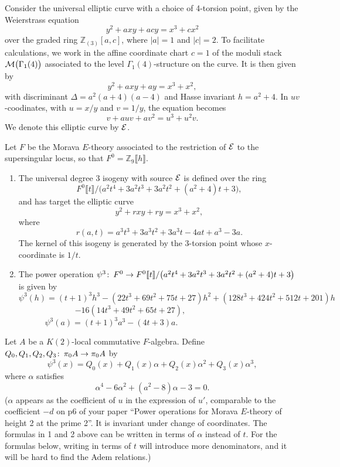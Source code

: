 \documentclass[12pt]{article}
\theoremstyle{definition}
\theoremstyle{remark}
\def\co{\colon\thinspace}
\newcommand{\mb}[1]{\mathbb{#1}}
\begin{document}
Consider the universal elliptic curve with a choice of 4-torsion point, given 
by the Weierstrass equation 
\[
 y^2 + a x y + a c y = x^3 + c x^2 
\]
over the graded ring ${\mb Z}_{(3)}[a,c]$, where $|a| = 1$ and $|c| = 2$.  To 
facilitate calculations, we work in the affine coordinate chart $c = 1$ of the 
moduli stack ${\cal M}\big(\Gamma_1(4)\big)$ associated to the level 
$\Gamma_1(4)$-structure on the curve. It is then given by 
\[
 y^2 + a x y + a y = x^3 + x^2, 
\]
with discriminant $\Delta = a^2(a + 4)(a - 4)$ and Hasse invariant 
$h = a^2 + 4$.  In $uv$-coodinates, with $u = x/y$ and $v = 1/y$, the 
equation becomes 
\[
 v + a u v + a v^2 = u^3 + u^2 v.  
\]
We denote this elliptic curve by $\cal E$.  

Let $F$ be the Morava $E$-theory associated to the restriction of $\cal E$ to 
the supersingular locus, so that $F^0 = {\mb Z}_9 \llbracket h \rrbracket$.  

\begin{enumerate}
 \item The universal degree 3 isogeny with source $\cal E$ is defined over 
 the ring 
 \[
  F^0 \llbracket t \rrbracket / 
  \big(a^2 t^4 + 3 a^2 t^3 + 3 a^2 t^2 + (a^2 + 4) t + 3\big), 
 \]
 and has target the elliptic curve 
 \[
  y^2 + r x y + r y = x^3 + x^2, 
 \]
 where 
 \[
  r(a,t) = a^3 t^3 + 3 a^3 t^2 + 3 a^3 t - 4 a t + a^3 - 3 a.  
 \]
 The kernel of this isogeny is generated by the 3-torsion point whose 
 $x$-coordinate is $1/t$.  
 \item The power operation $\psi^3\co F^0  \to F^0 \llbracket t \rrbracket / 
 \big(a^2 t^4 + 3 a^2 t^3 + 3 a^2 t^2 + (a^2 + 4) t + 3\big)$ is given by 
 \[
  \psi^3(h) = (t + 1)^3 h^3 - (22 t^3 + 69 t^2 + 75 t + 27) h^2 + (128 t^3 + 
  424 t^2 + 512 t + 201) h 
 \]
 \[
  - 16 (14 t^3 + 49 t^2 + 65 t + 27), 
  ~~~~~~~~~~~~~~~~~~~~~~~~~~~~~~~~ 
 \]
 \[
  \psi^3(a) = (t + 1)^3 a^3 - (4 t + 3) a.  
  ~~~~~~~~~~~~~~~~~~~~~~~~~~~~~~~~~~~~~~~~~~~~~~~~~~~~~ 
 \]
\end{enumerate}

Let $A$ be a $K(2)$-local commutative $F$-algebra.  Define 
$Q_0, Q_1, Q_2, Q_3\co\pi_0A \to \pi_0A$ by 
\[
 \psi^3 (x) = Q_0(x) + Q_1(x) \alpha + Q_2(x) \alpha^2 +Q_3(x) \alpha^3, 
\]
where $\alpha$ satisfies 
\[
 \alpha^4 - 6\alpha^2 + (a^2-8)\alpha-3 = 0.  
\]
($\alpha$ appears as the coefficient of $u$ in the expression of $u'$, 
comparable to the coefficient $-d$ on p6 of your paper ``Power operations for 
Morava $E$-theory of height 2 at the prime 2''.  It is invariant under change 
of coordinates.  The formulas in 1 and 2 above can be written in terms of 
$\alpha$ instead of $t$.  For the formulas below, writing in terms of $t$ 
will introduce more denominators, and it will be hard to find the Adem 
relations.)  
\end{document}
